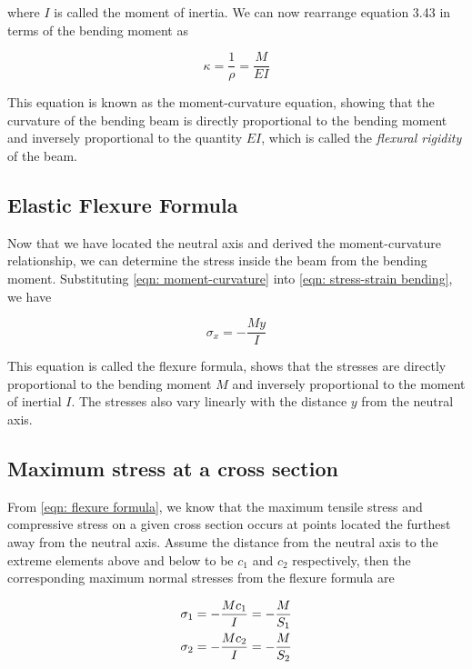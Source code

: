 \documentclass[
fontsize=10pt,
a4paper,
twosides=false,
open=any,
svgnames,
]{kaobook} %
\begin{document}
where $I$ is called the moment of inertia. We can now rearrange equation 3.43 in terms of the bending moment as

\begin{equation} \label{eqn: moment-curvature}
  \kappa  = \frac{1}{\rho } = \frac{M}{{EI}}
\end{equation}

This equation is known as the moment-curvature equation, showing that the curvature of the bending beam is directly proportional to the bending moment and inversely proportional to the quantity $EI$, which is called the \emph{flexural rigidity} of the beam.

\subsection{Elastic Flexure Formula}

Now that we have located the neutral axis and derived the moment-curvature relationship, we can determine the stress inside the beam from the bending moment. Substituting \cref{eqn: moment-curvature} into \cref{eqn: stress-strain bending}, we have

\begin{equation} \label{eqn: flexure formula}
  {\sigma _x} =  - \frac{{My}}{I}
\end{equation}

This equation is called the flexure formula, shows that the stresses are directly proportional to the bending moment $M$ and inversely proportional to the moment of inertial $I$. The stresses also vary linearly with the distance $y$ from the neutral axis.

\subsection{Maximum stress at a cross section}

From \cref{eqn: flexure formula}, we know that the maximum tensile stress and compressive stress on a given cross section occurs at points located the furthest away from the neutral axis. Assume the distance from the neutral axis to the extreme elements above and below to be $c_1$ and $c_2$ respectively, then the corresponding maximum normal stresses from the flexure formula are

\begin{equation} \label{eqn: section modulus}
  \begin{gathered}
    \sigma _1 =  - \frac{Mc_1}{I} =  - \frac{M}{S_1} \hfill \\
    \sigma _2 =  - \frac{Mc_2}{I} =  - \frac{M}{S_2} \hfill \\ 
  \end{gathered}
\end{equation}
\end{document}
